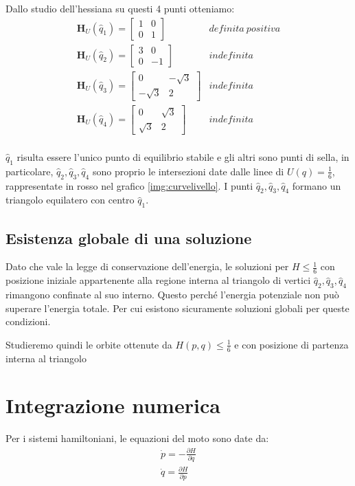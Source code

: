 \documentclass[a4paper, 12pt]{article}
\numberwithin{equation}{section}
\numberwithin{figure}{section}
\newcommand{\hess}[1]{\mathbf{H}_{#1}}
\begin{document}
Dallo studio dell'hessiana su questi 4 punti otteniamo:
\begin{eqnarray*}
\hess{U}(\hat{q}_1) =
	\begin{bmatrix}
		1& 0\\ 0 & 1
	\end{bmatrix} &definita\ positiva\\
%
\hess{U}(\hat{q}_2) = 
	\begin{bmatrix}
		3 & 0 \\ 0 & -1	
	\end{bmatrix} &indefinita\\
%
\hess{U}(\hat{q}_3) = 
	\begin{bmatrix}
		0 & -\sqrt{3} \\
		-\sqrt{3} & 2
	\end{bmatrix}&indefinita\\
%
\hess{U}(\hat{q}_4) = 
	\begin{bmatrix}
		0 & \sqrt{3} \\
		\sqrt{3} & 2
	\end{bmatrix}&indefinita\\
\end{eqnarray*}

$\hat{q}_1$ risulta essere l'unico punto di equilibrio stabile e gli altri sono punti di sella, in particolare,
$\hat{q}_2, \hat{q}_3, \hat{q}_4$ sono proprio le intersezioni date dalle linee di $U(q)=\frac{1}{6}$, rappresentate in rosso nel
grafico \ref{img:curvelivello}. I punti $\hat{q}_2, \hat{q}_3, \hat{q}_4$ formano un triangolo equilatero con centro $\hat{q}_1$.

\subsection{Esistenza globale di una soluzione}
Dato che vale la legge di conservazione dell'energia, 
le soluzioni per $H \le \frac{1}{6}$ con posizione iniziale appartenente alla regione interna al triangolo
di vertici $\hat{q}_2, \hat{q}_3, \hat{q}_4$ rimangono confinate al suo interno. Questo perché l'energia potenziale non può
superare l'energia totale. Per cui esistono sicuramente soluzioni globali per queste condizioni.

Studieremo quindi le orbite ottenute da $H(p,q) \le \frac{1}{6}$ e con posizione di partenza interna al triangolo

\section{Integrazione numerica}
Per i sistemi hamiltoniani, le equazioni del moto sono date da:
\begin{eqnarray}
	\dot{p} = -\frac{\partial H}{\partial q}\\
	\dot{q} = \frac{\partial H}{\partial p}
\end{eqnarray}
\end{document}
